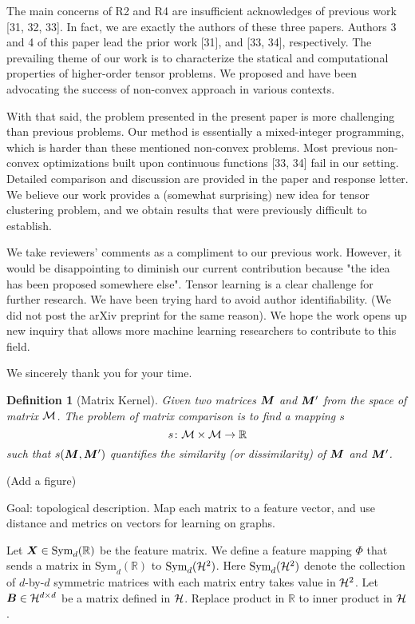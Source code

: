 \documentclass[12pt]{article}
\newtheorem{defn}{Definition}
\begin{document}
The main concerns of R2 and R4 are insufficient acknowledges of previous work [31, 32, 33]. In fact, we are exactly the authors of these three papers. Authors 3 and 4 of this paper lead the prior work [31], and [33, 34], respectively. The prevailing theme of our work is to characterize the statical and computational properties of higher-order tensor problems. We proposed and have been advocating the success of non-convex approach in various contexts. 

With that said, the problem presented in the present paper is more challenging than previous problems. Our method is essentially a mixed-integer programming, which is harder than these mentioned non-convex problems. Most previous non-convex optimizations built upon continuous functions [33, 34] fail in our setting. Detailed comparison and discussion are provided in the paper and response letter. We believe our work provides a (somewhat surprising) new idea for tensor clustering problem, and we obtain results that were previously difficult to establish.

We take reviewers' comments as a compliment to our previous work. However, it would be disappointing to diminish our current contribution because "the idea has been proposed somewhere else". Tensor learning is a clear challenge for further research. We have been trying hard to avoid author identifiability. (We did not post the arXiv preprint for the same reason). We hope the work opens up new inquiry that allows more machine learning researchers to contribute to this field. 

We sincerely thank you for your time. 

\begin{defn}[Matrix Kernel] Given two matrices $\bm M$ and $\bm M'$ from the space of matrix $\mathcal{M}$. The problem of matrix comparison is to find a mapping $s$
\[
s\colon \mathcal{M} \times \mathcal{M} \to \mathbb{R} 
\]
such that $s(\bm M,\bm M')$ quantifies the similarity (or dissimilarity) of $\bm M$ and $\bm M'$.
\end{defn}
(Add a figure)

Goal: topological description. Map each matrix to a feature vector, and use distance and metrics on vectors for learning on graphs. 

Let $\bm X\in\text{Sym}_d(\mathbb{R})$ be the feature matrix. We define a feature mapping $\Phi$ that sends a matrix in $\text{Sym}_d(\mathbb{R})$ to $\text{Sym}_d(\mathcal{H}^2)$. Here $\text{Sym}_d(\mathcal{H}^2)$ denote the collection of $d$-by-$d$ symmetric matrices with each matrix entry takes value in $\mathcal{H}^2$. 
Let $\bm B\in\mathcal{H}^{d\times d}$ be a matrix defined in $\mathcal{H}$. Replace product in $\mathbb{R}$ to inner product in $\mathcal{H}$. 
\end{document}
